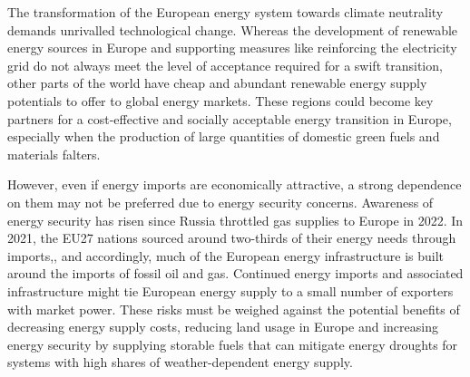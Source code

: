 

The transformation of the European energy system towards climate neutrality
demands unrivalled technological change.
Whereas the development of renewable
energy sources in Europe and supporting measures like reinforcing the
electricity grid do not always meet the level of acceptance required for a swift
transition, other parts of the world have cheap and abundant renewable energy
supply potentials to offer to global energy
markets.\cite{irenaGlobalHydrogen2022,luxSupplyCurves2021,vanderzwaanTimmermansDream2021,fasihiLongTermHydrocarbon2017,reichenbergDeepDecarbonization2022,galvanExportingSunshine2022,armijoFlexibleProduction2020,pfennigGlobalGISbased2022}
These regions could become key partners for a cost-effective and socially
acceptable energy transition in Europe, especially when the production of large
quantities of domestic green fuels and materials falters.


However, even if energy imports are economically attractive, a strong dependence
on them may not be preferred due to energy security concerns.  Awareness of
energy security has risen since Russia throttled gas supplies to Europe in
2022.\cite{pedersenLongtermImplications2022} In 2021, the EU27 nations sourced
around two-thirds of their energy needs through
imports,\cite{eurostatCompleteEnergy2023}, and accordingly, much of the European
energy infrastructure is built around the imports of fossil oil and gas.
Continued energy imports and associated infrastructure might tie European energy
supply to a small number of exporters with market power. These risks
must be weighed against the potential benefits of decreasing energy supply
costs, reducing land usage in Europe and increasing energy security by supplying
storable fuels that can mitigate energy droughts for systems with high shares of
weather-dependent energy supply.

